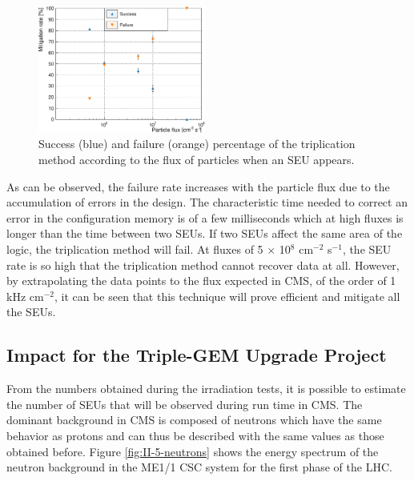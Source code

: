       \begin{figure}[h!]
        \centering
        \includegraphics[width=0.49\textwidth]{img/plots/c_l-crop}
        \caption{Success (blue) and failure (orange) percentage of the triplication method according to the flux of particles when an SEU appears. }
        \label{fig:II-5-data-triplication}
      \end{figure}

      As can be observed, the failure rate increases with the particle flux due to the accumulation of errors in the design. The characteristic time needed to correct an error in the configuration memory is of a few milliseconds which at high fluxes is longer than the time between two SEUs. If two SEUs affect the same area of the logic, the triplication method will fail. At fluxes of 5 $ \times $ 10$^8$ cm$^{-2}$ s$^{-1}$, the SEU rate is so high that the triplication method cannot recover data at all. However, by extrapolating the data points to the flux expected in CMS, of the order of 1 kHz cm$^{-2}$, it can be seen that this technique will prove efficient and mitigate all the SEUs.

    \subsection{Impact for the Triple-GEM Upgrade Project}

      From the numbers obtained during the irradiation tests, it is possible to estimate the number of SEUs that will be observed during run time in CMS. The dominant background in CMS is composed of neutrons which have the same behavior as protons \cite{Huhtinen2000155} and can thus be described with the same values as those obtained before. Figure \ref{fig:II-5-neutrons} shows the energy spectrum of the neutron background in the ME1/1 CSC system for the first phase of the LHC. \\

